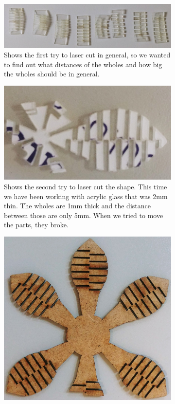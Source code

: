 \documentclass[04.3_buildingProcess.tex]{subfiles}
\begin{document}
\begin{flushleft}
        \begin{figure}[H]
            \centering
            \begin{subfigure}{.45\textwidth}
            \centering
            \includegraphics[width=0.8\linewidth]{images/materialProcess/01_LaserCut.jpg}
            \caption{Shows the first try to laser cut in general, so we wanted to
                    find out what distances of the wholes and how big the wholes 
                    should be in general.}
            \label{fig:01_LaserCut}
            \vspace{6mm}
            \end{subfigure}
            \medskip
            \hspace{1mm}
            \begin{subfigure}{.45\textwidth}
                \centering
                \includegraphics[width=0.6\linewidth]{images/materialProcess/02_LaserCut.jpg}
                \caption{Shows the second try to laser cut the shape. This time we have been
                        working with acrylic glass that was 2mm thin. The wholes are 1mm thick 
                        and the distance between those are only 5mm. When we tried to move
                        the parts, they broke.}
                \label{fig:02_LaserCut}
                \vspace{6mm}
            \end{subfigure}
            \hspace{1mm}
            \begin{subfigure}{.45\textwidth}
                \centering
                \includegraphics[width=0.6\linewidth]{images/materialProcess/03_LaserCut.jpg}

\end{subfigure}
\end{figure}
\end{flushleft}
\end{document}
